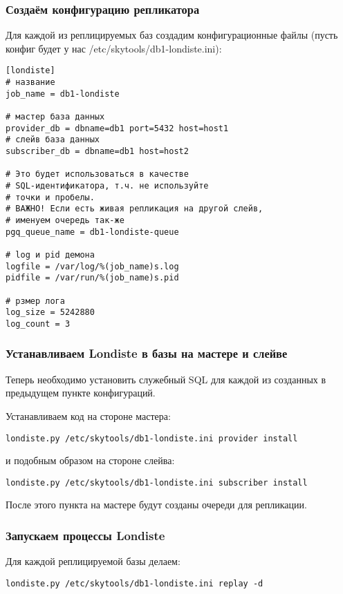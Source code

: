 \subsubsection{Создаём конфигурацию репликатора}
Для каждой из реплицируемых баз создадим конфигурационные файлы 
(пусть конфиг будет у нас /etc/skytools/db1-londiste.ini):
\begin{lstlisting}[label=lst:londiste9,caption=Создаём конфигурацию репликатора]
[londiste]
# название
job_name = db1-londiste

# мастер база данных
provider_db = dbname=db1 port=5432 host=host1
# слейв база данных
subscriber_db = dbname=db1 host=host2

# Это будет использоваться в качестве 
# SQL-идентификатора, т.ч. не используйте
# точки и пробелы.
# ВАЖНО! Если есть живая репликация на другой слейв, 
# именуем очередь так-же
pgq_queue_name = db1-londiste-queue

# log и pid демона
logfile = /var/log/%(job_name)s.log
pidfile = /var/run/%(job_name)s.pid

# рзмер лога
log_size = 5242880
log_count = 3
\end{lstlisting}

\subsubsection{Устанавливаем Londiste в базы на мастере и слейве}
Теперь необходимо установить служебный SQL для каждой из созданных в предыдущем
пункте конфигураций.

Устанавливаем код на стороне мастера:
\begin{lstlisting}[label=lst:londiste10,caption=Londiste]
londiste.py /etc/skytools/db1-londiste.ini provider install
\end{lstlisting}
и подобным образом на стороне слейва:
\begin{lstlisting}[label=lst:londiste11,caption=Londiste]
londiste.py /etc/skytools/db1-londiste.ini subscriber install
\end{lstlisting}

После этого пункта на мастере будут созданы очереди для репликации.

\subsubsection{Запускаем процессы Londiste}
Для каждой реплицируемой базы делаем:
\begin{lstlisting}[label=lst:londiste12,caption=Запускаем]
londiste.py /etc/skytools/db1-londiste.ini replay -d
\end{lstlisting}

